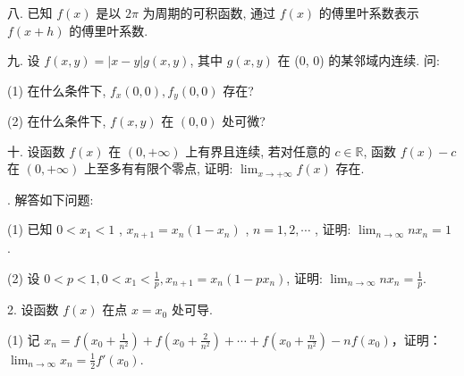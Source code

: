 \documentclass{examcollection}
\begin{document}
{\begin{minipage}{\textwidth}
八. 已知 $f(x)$ 是以 $2\pi$ 为周期的可积函数, 通过 $f(x)$ 的傅里叶系数表示 $f(x + h)$ 的傅里叶系数.\par
九. 设 $f(x, y) = |x - y| g(x, y)$, 其中 $g(x, y)$ 在 (0, 0) 的某邻域内连续. 问:\par
(1) 在什么条件下, $f_{x}(0,0), f_{y}(0,0)$ 存在?\par
(2) 在什么条件下, $f(x,y)$ 在 $(0,0)$ 处可微?\par
十. 设函数 $f(x)$ 在 $(0, +\infty)$ 上有界且连续, 若对任意的 $c \in \mathbb{R}$, 函数 $f(x) - c$ 在 $(0, +\infty)$ 上至多有有限个零点, 证明: $\lim_{x \to +\infty} f(x)$ 存在.\par
{}. 解答如下问题:\par
(1) 已知  $0 < x_{1} < 1$ ,  $x_{n+1} = x_{n}(1 - x_{n})$ ,  $n = 1, 2, \cdots$ , 证明:  $\lim_{n \to \infty} nx_{n} = 1$ .\par
(2) 设 $0 < p < 1, 0 < x_{1} < \frac{1}{p}, x_{n+1} = x_{n}(1 - px_{n})$, 证明: $\lim_{n \to \infty} nx_{n} = \frac{1}{p}$.\par
2. 设函数 $f(x)$ 在点 $x = x_0$ 处可导.\par
(1) 记 $x_{n} = f\left(x_{0} + \frac{1}{n^{2}}\right) + f\left(x_{0} + \frac{2}{n^{2}}\right) + \cdots + f\left(x_{0} + \frac{n}{n^{2}}\right) - nf(x_{0})$，证明：$\lim_{n \to \infty} x_{n} = \frac{1}{2} f'(x_{0})$.\par
\end{minipage}}
\ifdim\dimexpr\ht\proofbox+\dp\proofbox\relax>\textheight
\noindent\resizebox{!}{\textheight}{\usebox{\proofbox}}\else\noindent\usebox{\proofbox}\fi\clearpage
\end{document}
